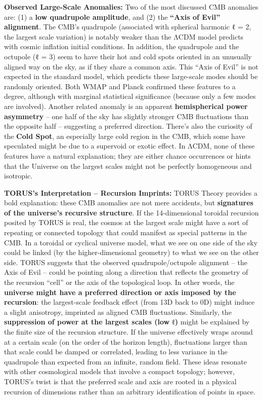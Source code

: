 \textbf{Observed Large-Scale Anomalies:} Two of the most discussed CMB
anomalies are: (1) a \textbf{low quadrupole amplitude}, and (2) the
\textbf{``Axis of Evil'' alignment}. The CMB's quadrupole (associated
with spherical harmonic ℓ = 2, the largest scale variation) is notably
weaker than the ΛCDM model predicts with cosmic inflation initial
conditions. In addition, the quadrupole and the octupole (ℓ = 3) seem to
have their hot and cold spots oriented in an unusually aligned way on
the sky, as if they share a common axis. This ``Axis of Evil'' is not
expected in the standard model, which predicts these large-scale modes
should be randomly oriented. Both WMAP and Planck confirmed these
features to a degree, although with marginal statistical significance
(because only a few modes are involved). Another related anomaly is an
apparent \textbf{hemispherical power asymmetry} -- one half of the sky
has slightly stronger CMB fluctuations than the opposite half --
suggesting a preferred direction. There's also the curiosity of the
\textbf{Cold Spot}, an especially large cold region in the CMB, which
some have speculated might be due to a supervoid or exotic effect. In
ΛCDM, none of these features have a natural explanation; they are either
chance occurrences or hints that the Universe on the largest scales
might not be perfectly homogeneous and isotropic.

\textbf{TORUS's Interpretation -- Recursion Imprints:} TORUS Theory
provides a bold explanation: these CMB anomalies are not mere accidents,
but \textbf{signatures of the universe's recursive structure}. If the
14-dimensional toroidal recursion posited by TORUS is real, the cosmos
at the largest scale might have a sort of repeating or connected
topology that could manifest as special patterns in the CMB. In a
toroidal or cyclical universe model, what we see on one side of the sky
could be linked (by the higher-dimensional geometry) to what we see on
the other side. TORUS suggests that the observed quadrupole/octupole
alignment -- the Axis of Evil -- could be pointing along a direction
that reflects the geometry of the recursion ``cell'' or the axis of the
topological loop​. In other words, the \textbf{universe might have a
preferred direction or axis imposed by the recursion}: the largest-scale
feedback effect (from 13D back to 0D) might induce a slight anisotropy,
imprinted as aligned CMB fluctuations​. Similarly, the
\textbf{suppression of power at the largest scales (low ℓ)} might be
explained by the finite size of the recursion structure. If the universe
effectively wraps around at a certain scale (on the order of the horizon
length), fluctuations larger than that scale could be damped or
correlated, leading to less variance in the quadrupole than expected
from an infinite, random field. These ideas resonate with other
cosmological models that involve a compact topology; however, TORUS's
twist is that the preferred scale and axis are rooted in a physical
recursion of dimensions rather than an arbitrary identification of
points in space.

